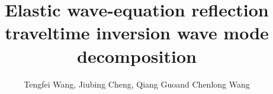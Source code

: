 \makeatletter
\newcommand{\rome}[1]{\romannumeral #1}
\newcommand{\Rome}[1]{\expandafter\@slowromancap\romannumeral #1@}
\makeatother
\title{Elastic wave-equation reflection traveltime inversion wave mode decomposition}
\author{
	Tengfei Wang\footnotemark[1], Jiubing Cheng\footnotemark[2], Qiang Guo\footnotemark[3] and Chenlong Wang\footnotemark[4] 
}
\address{
	\footnotemark[1] School of Ocean and Earth Science, Tongji University, Shanghai,
	China. E-mail: 1110701@tongji.edu.cn\\
	\footnotemark[2] State Key Laboratory of Marine Geology, Tongji University,
	Shanghai, China. E-mail: cjb1206@tongji.edu.cn\\
	\footnotemark[3] School of Ocean and Earth Science, Tongji University, Shanghai,
	China. E-mail: 1110701@tongji.edu.cn\\
	\footnotemark[4] State Key Laboratory of Marine Geology, Tongji University,
	Shanghai, China. E-mail: cjb1206@tongji.edu.cn
}
\maketitle

